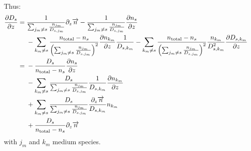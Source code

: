 Thus:
\begin{equation}
\begin{split}
\frac{\partial D_s}{\partial z} = &\;   \frac{1}{\sum_{j_m \neq s}\frac{n_{j_m}}{D_{s,j_m}}}\partial_{z}{\overrightarrow{n}} 
                        - \frac{1}{\sum_{j_m \neq s}\frac{n_{j_m}}{D_{s,j_m}}}\frac{\partial n_s}{\partial z} \\
                    &\; - \sum_{k_m\neq s}\frac{n_\text{total} - n_s}{\left(\sum_{j_m \neq s}\frac{n_{j_m}}{D_{s,j_m}}\right)^2}
                                \frac{\partial n_{k_m}}{\partial z}\frac{1}{D_{s,k_m}} 
                        -  \sum_{k_m\neq s}\frac{n_\text{total} - n_s}{\left(\sum_{j_m \neq s}\frac{n_{j_m}}{D_{s,j_m}}\right)^2} 
                                \frac{n_{k_m}}{D_{s,k_m}^2}\frac{\partial D_{s,k_m}}{\partial z}\\
                  = &\; - \frac{D_s}{n_\text{total} - n_s}\frac{\partial n_s}{\partial z} \\
                    &\; - \sum_{k_m\neq s}\frac{D_s}{\sum_{j_m \neq s}\frac{n_{j_m}}{D_{s,j_m}}}
                                \frac{1}{D_{s,k_m}} \frac{\partial n_{k_m}}{\partial z} \\
                    &\; +  \sum_{k_m\neq s}\frac{D_s}{\sum_{j_m \neq s}\frac{n_{j_m}}{D_{s,j_m}}} 
                                \frac{\partial_{z}{\overrightarrow{n}}}{D_{s,k_m}}n_{k_m} \\
                    &\; + \frac{D_s}{n_\text{total} - n_s}\partial_{z}{\overrightarrow{n}} \\
\end{split}
\label{Titan:dDs_dz}
\end{equation}
with $j_m$ and $k_m$ medium species.

